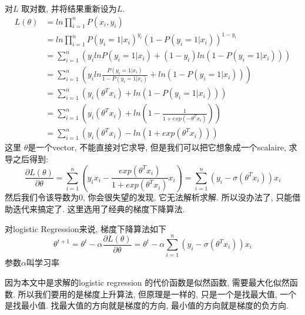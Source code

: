 对$L$ 取对数, 并将结果重新设为$L$.
$$
\begin{aligned}
L(\theta)
& = ln \prod_{i = 1}^{n} P(x_i, y_i) \\
& = ln \prod_{i = 1}^{n} P(y_i = 1 | x_i)^{y_i} (1 - P(y_i = 1 | x_i))^{1 - y_i} \\
& = \sum_{i = 1}^{n} (y_i ln P(y_i = 1 | x_i) + (1 - y_i) ln (1 - P(y_i = 1 | x_i))) \\
& = \sum_{i = 1}^{n} (y_i ln \frac{P(y_i = 1 | x_i)}{1 - P(y_i = 1 | x_i)} + ln (1 - P(y_i = 1 | x_i))) \\
& = \sum_{i = 1}^{n} (y_i (\theta^T x_i) + ln (1 - P(y_i = 1 | x_i))) \\
& = \sum_{i = 1}^{n} (y_i (\theta^T x_i) + ln (1 - \frac{1}{1 + exp(- \theta^T x_i)})) \\
& = \sum_{i = 1}^{n} (y_i (\theta^T x_i) - ln (1 + exp(\theta^T x_i)))
\end{aligned}
$$
这里 $\theta$是一个vector, 不能直接对它求导, 但是我们可以把它想象成一个scalaire, 求导之后得到:
$$
\frac{\partial L(\theta)}{\partial \theta}
= \sum_{i = 1}^n (y_i x_i - \frac{exp(\theta^T x_i)}{1 + exp(\theta^T x_i)} x_i)
= \sum_{i = 1}^n (y_i - \sigma(\theta^T x_i)) x_i
$$
然后我们令该导数为$0$, 你会很失望的发现, 它无法解析求解. 所以没办法了, 只能借助迭代来搞定了. 这里选用了经典的梯度下降算法.

对logistic Regression来说, 梯度下降算法如下
$$
\theta^{t + 1}
= \theta^t - \alpha \frac{\partial L(\theta)}{\partial \theta}
= \theta^t - \alpha \sum_{i = 1}^n (y_i - \sigma(\theta^T x_i)) x_i
$$
参数$\alpha$叫学习率

因为本文中是求解的logistic regression 的代价函数是似然函数, 需要最大化似然函数. 所以我们要用的是梯度上升算法, 但原理是一样的, 只是一个是找最大值, 一个是找最小值.
找最大值的方向就是梯度的方向, 最小值的方向就是梯度的负方向.

